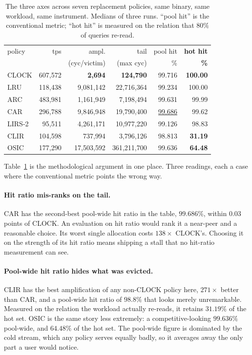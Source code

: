 \documentclass[sigconf,nonacm]{acmart}
\begin{document}
\begin{table}[t]
\centering
\caption{The three axes across seven replacement policies, same binary, same
workload, same instrument. Medians of three runs. ``pool hit'' is the
conventional metric; ``hot hit'' is measured on the relation that $80\%$ of
queries re-read.}
\label{tab:algos}
\small
\begin{tabular}{lrrrrr}
\toprule
policy & tps & ampl. & tail & pool hit & \textbf{hot hit} \\
       &     & (cyc/victim) & (max cyc) & \% & \textbf{\%} \\
\midrule
CLOCK   & 607{,}572 & \textbf{2{,}694} & \textbf{124{,}790} & 99.716 & \textbf{100.00} \\
LRU     & 118{,}438 & 9{,}081{,}142 & 22{,}716{,}364 & 99.234 & 100.00 \\
ARC     & 483{,}981 & 1{,}161{,}949 & 7{,}198{,}494 & 99.631 & 99.99 \\
CAR     & 296{,}788 & 9{,}846{,}948 & 19{,}790{,}400 & \underline{99.686} & 99.62 \\
LIRS-2  & 95{,}511  & 4{,}261{,}171 & 10{,}977{,}220 & 99.126 & 98.83 \\
CLIR    & 104{,}598 & 737{,}994 & 3{,}796{,}126 & 98.813 & \textbf{31.19} \\
OSIC    & 177{,}290 & 17{,}503{,}592 & 361{,}211{,}700 & 99.636 & \textbf{64.48} \\
\bottomrule
\end{tabular}
\end{table}

Table~\ref{tab:algos} is the methodological argument in one place. Three
readings, each a case where the conventional metric points the wrong way.

\paragraph{Hit ratio mis-ranks on the tail.} CAR has the second-best pool-wide
hit ratio in the table, $99.686\%$, within $0.03$ points of CLOCK. An
evaluation on hit ratio would rank it a near-peer and a reasonable choice. Its
worst single allocation costs $138\times$ CLOCK's. Choosing it on the strength
of its hit ratio means shipping a stall that no hit-ratio measurement can see.

\paragraph{Pool-wide hit ratio hides what was evicted.} CLIR has the best
amplification of any non-CLOCK policy here, $271\times$ better than CAR, and a
pool-wide hit ratio of $98.8\%$ that looks merely unremarkable. Measured on the
relation the workload actually re-reads, it retains $31.19\%$ of the hot set.
OSIC is the same story less extremely: a competitive-looking $99.636\%$
pool-wide, and $64.48\%$ of the hot set. The pool-wide figure is dominated by
the cold stream, which any policy serves equally badly, so it averages away the
only part a user would notice.
\end{document}
